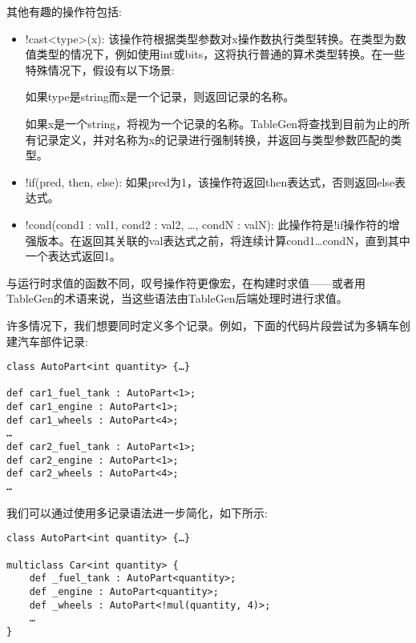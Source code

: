 其他有趣的操作符包括:

\begin{itemize}
\ttfamily

\item !cast<type>(x): 该操作符根据类型参数对x操作数执行类型转换。在类型为数值类型的情况下，例如使用int或bits，这将执行普通的算术类型转换。在一些特殊情况下，假设有以下场景:

如果type是string而x是一个记录，则返回记录的名称。

如果x是一个string，将视为一个记录的名称。TableGen将查找到目前为止的所有记录定义，并对名称为x的记录进行强制转换，并返回与类型参数匹配的类型。

\item !if(pred, then, else): 如果pred为1，该操作符返回then表达式，否则返回else表达式。

\item !cond(cond1 : val1, cond2 : val2, …, condN : valN): 此操作符是!if操作符的增强版本。在返回其关联的val表达式之前，将连续计算cond1…condN，直到其中一个表达式返回1。
\end{itemize}

\begin{tcolorbox}[colback=blue!5!white,colframe=blue!75!black, fonttitle=\bfseries,title=Note]
\hspace*{0.7cm}与运行时求值的函数不同，叹号操作符更像宏，在构建时求值——或者用TableGen的术语来说，当这些语法由TableGen后端处理时进行求值。
\end{tcolorbox}


许多情况下，我们想要同时定义多个记录。例如，下面的代码片段尝试为多辆车创建汽车部件记录:

\begin{lstlisting}[style=styleCXX]
class AutoPart<int quantity> {…}

def car1_fuel_tank : AutoPart<1>;
def car1_engine : AutoPart<1>;
def car1_wheels : AutoPart<4>;
…
def car2_fuel_tank : AutoPart<1>;
def car2_engine : AutoPart<1>;
def car2_wheels : AutoPart<4>;
…
\end{lstlisting}

我们可以通过使用多记录语法进一步简化，如下所示:

\begin{lstlisting}[style=styleCXX]
class AutoPart<int quantity> {…}

multiclass Car<int quantity> {
	def _fuel_tank : AutoPart<quantity>;
	def _engine : AutoPart<quantity>;
	def _wheels : AutoPart<!mul(quantity, 4)>;
	…
}
\end{lstlisting}

